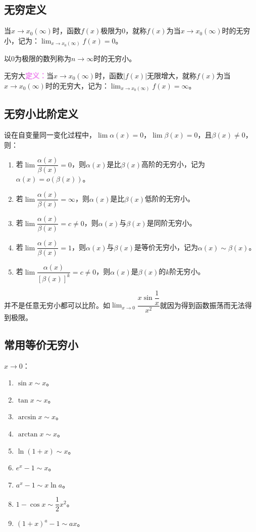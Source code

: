 \documentclass[UTF8]{ctexart}
\begin{document}
\subsection{无穷定义}

当$x\to x_0(\infty)$时，函数$f(x)$极限为0，就称$f(x)$为当$x\to x_0(\infty)$时的无穷小，记为：$\lim_{x\to x_0(\infty)}f(x)=0$。

以0为极限的数列称为$n\to\infty$时的无穷小。

无穷大\textcolor{violet}{\textbf{定义：}}当$x\to x_0(\infty)$时，函数$\vert f(x)\vert$无限增大，就称$f(x)$为当$x\to x_0(\infty)$时的无穷大，记为：$\lim_{x\to x_0(\infty)}f(x)=\infty$。

\subsection{无穷小比阶定义}

设在自变量同一变化过程中，$\lim\alpha(x)=0$，$\lim\beta(x)=0$，且$\beta(x)\neq 0$，则：

\begin{enumerate}
    \item 若$\lim\dfrac{\alpha(x)}{\beta(x)}=0$，则$\alpha(x)$是比$\beta(x)$高阶的无穷小，记为$\alpha(x)=o(\beta(x))$。
    \item 若$\lim\dfrac{\alpha(x)}{\beta(x)}=\infty$，则$\alpha(x)$是比$\beta(x)$低阶的无穷小。
    \item 若$\lim\dfrac{\alpha(x)}{\beta(x)}=c\neq 0$，则$\alpha(x)$与$\beta(x)$是同阶无穷小。
    \item 若$\lim\dfrac{\alpha(x)}{\beta(x)}=1$，则$\alpha(x)$与$\beta(x)$是等价无穷小，记为$\alpha(x)\sim\beta(x)$。
    \item 若$\lim\dfrac{\alpha(x)}{[\beta(x)]^k}=c\neq 0$，则$\alpha(x)$是$\beta(x)$的$k$阶无穷小。
\end{enumerate}

并不是任意无穷小都可以比阶。如$\lim_{x\to 0}\dfrac{x\sin\dfrac{1}{x}}{x^2}$就因为得到函数振荡而无法得到极限。

\subsection{常用等价无穷小}

$x\to 0$：

\begin{enumerate}
    \item $\sin x\sim x$。
    \item $\tan x\sim x$。
    \item $\arcsin x\sim x$。
    \item $\arctan x\sim x$。
    \item $\ln(1+x)\sim x$。
    \item $e^x-1\sim x$。
    \item $a^x-1\sim x\ln a$。
    \item $1-\cos x\sim\dfrac{1}{2}x^2$。
    \item $(1+x)^a-1\sim ax$。
\end{enumerate}
\end{document}
